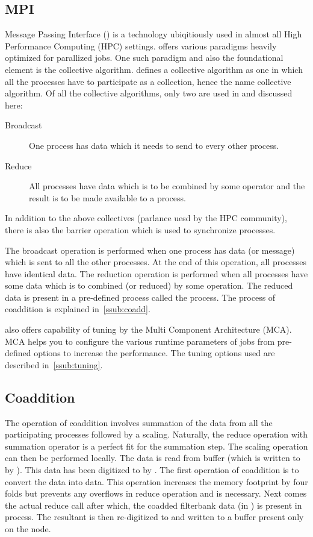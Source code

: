 \subsection {MPI}
\par Message Passing Interface (\mpi) is a technology ubiqitiously used in almost all High Performance Computing (HPC) settings. 
\mpi offers various paradigms heavily optimized for parallized jobs. One such paradigm and also the foundational element is the collective algorithm. 
\mpi defines a collective algorithm as one in which all the processes have to participate as a collection, hence the name collective algorithm. Of all the collective algorithms, only two are used in \vf and discussed here:
\begin{description}
	\item[Broadcast] One process has data which it needs to send to every other process.
	\item[Reduce] All processes have data which is to be combined by some operator and the result is to be made available to a process.
\end{description}
In addition to the above collectives (parlance uesd by the HPC community), there is also the barrier operation which is used to synchronize processes. 

\par The broadcast operation is performed when one process has data (or message) which is sent to all the other processes. At the end of this operation, all processes have identical data. The reduction operation is performed when all processes have some data which is to combined (or reduced) by some operation. The reduced data is present in a pre-defined process called the \root process. 
The process of coaddition is explained in~\autoref{ssub:coadd}. 

\par \mpi also offers capability of tuning by the Multi Component Architecture (MCA). MCA helps you to configure the various runtime parameters of \mpi jobs from pre-defined options to increase the performance. The tuning options used are described in~\autoref{ssub:tuning}.

\subsection {Coaddition}
\label{ssub:coadd}

\par The operation of coaddition involves summation of the data from all the participating processes followed by a scaling. Naturally, the reduce operation with summation operator is a perfect fit for the summation step. 
The scaling operation can then be performed locally. 
The data is read from \dada buffer (which is written to by \pb). This data has been digitized to \nbit by \pb. 
The first operation of coaddition is to convert the \nbit data into \float data. 
This operation increases the memory footprint by four folds but prevents any overflows in reduce operation and is necessary. 
Next comes the actual \mpi reduce call after which, the coadded filterbank data (in \float) is present in \root process.
The resultant \float is then re-digitized to \nbit and written to a \dada buffer present only on the \root node.

